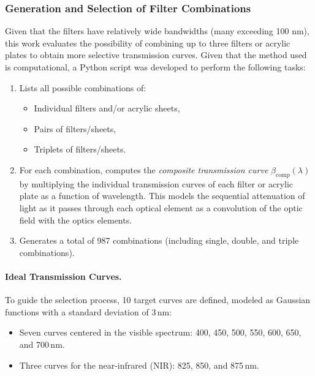 \subsubsection{Generation and Selection of Filter Combinations}
\label{subsub:combinaciones_filtros}

\noindent Given that the filters have relatively wide bandwidths (many exceeding 100 nm), this work evaluates the possibility of combining up to three filters or acrylic plates to obtain more selective transmission curves. Given that the method used is computational, a Python script was developed to perform the following tasks: 

\begin{enumerate}
    \item Lists all possible combinations of:
    \begin{itemize}
        \item Individual filters and/or acrylic sheets,
        \item Pairs of filters/sheets,
        \item Triplets of filters/sheets.
    \end{itemize}
    \item For each combination, computes the \emph{composite transmission curve} \(\beta_{\text{comp}}(\lambda)\) by multiplying the individual transmission curves of each filter or acrylic plate as a function of wavelength. This models the sequential attenuation of light as it passes through each optical element as a convolution of the optic field with the optics elements.
    \item Generates a total of 987 combinations (including single, double, and triple combinations).
\end{enumerate}

\paragraph{Ideal Transmission Curves.}
To guide the selection process, 10 target curves are defined, modeled as Gaussian functions with a standard deviation of 3\,nm:

\begin{itemize}
    \item Seven curves centered in the visible spectrum: 400, 450, 500, 550, 600, 650, and 700\,nm.
    \item Three curves for the near-infrared (NIR): 825, 850, and 875\,nm.
\end{itemize}

